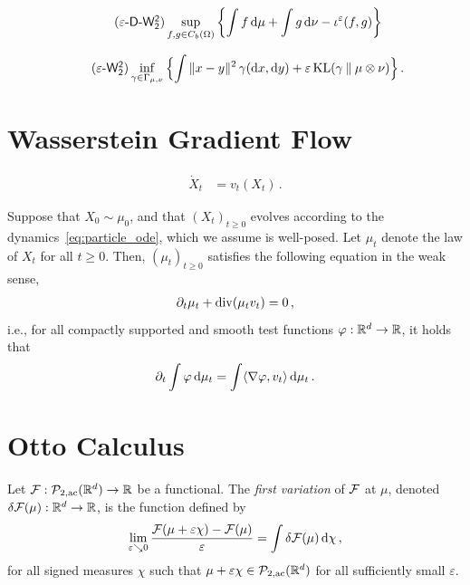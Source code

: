 \begin{equation}\label{eta-D}\tag{$\mathsf{\varepsilon}$\textsf{-D-}$\mathsf{W_2^2}$}
    \sup_{f, g \in C_b(\Omega)}{\biggl\{\int f \,\d \mu + \int g\, \d \nu - \iota^\varepsilon(f, g)\biggr\}}
\end{equation}

\begin{equation}
\label{eta}\tag{$\mathsf{\varepsilon}$-$\mathsf{W_2^2}$}
	\inf_{\gamma \in \Gamma_{\mu, \nu}}{\Bigl\{\int \|x - y\|^2\, \gamma(\d x,\d y) + \varepsilon \KL(\gamma \mmid \mu \otimes \nu)\Bigr\}}\,.
\end{equation}

\section{Wasserstein Gradient Flow}

\begin{align}\label{eq:particle_ode}
    \dot X_t
    &= v_t(X_t)\,.
\end{align}

\begin{proposition}
    Suppose that $X_0 \sim \mu_0$, and that ${(X_t)}_{t\geq 0}$ evolves according to the dynamics~\eqref{eq:particle_ode}, which we assume is well-posed.
    Let $\mu_t$ denote the law of $X_t$ for all $t\geq 0$.
    Then, ${(\mu_t)}_{t\geq 0}$ satisfies the following equation in the weak sense,
    \begin{align}\label{eq:continuity}
        \partial_t \mu_t + \operatorname{div}(\mu_t v_t) = 0\,,
    \end{align}
    i.e., for all compactly supported and smooth test functions $\varphi : \mathbb{R}^d\to\mathbb{R}$, it holds that
    \begin{align}\label{eq:continuity_weak}
        \partial_t \int \varphi \, \mathrm{d} \mu_t = \int \langle \nabla \varphi, v_t\rangle \, \mathrm{d} \mu_t\,.
    \end{align}
\end{proposition}


\section{Otto Calculus}

\begin{definition}\label{defn:first_variation}
    Let $\mathcal{F} : \mathcal{P}_{2,\rm ac}(\mathbb{R}^d)\to\mathbb{R}$ be a functional.
    The \emph{first variation} of $\mathcal{F}$ at $\mu$, denoted $\delta \mathcal{F}(\mu) : \mathbb{R}^d\to\mathbb{R}$, is the function defined by
    \begin{align}\label{eq:first_var_def}
        \lim_{\varepsilon\searrow 0}\frac{\mathcal{F}(\mu+\varepsilon\chi) - \mathcal{F}(\mu)}{\varepsilon} = \int \delta\mathcal{F}(\mu)\,\mathrm{d}\chi\,,
    \end{align}
    for all signed measures $\chi$ such that $\mu+\varepsilon\chi \in \mathcal{P}_{2,\rm ac}(\mathbb{R}^d)$ for all sufficiently small $\varepsilon$.
\end{definition}


